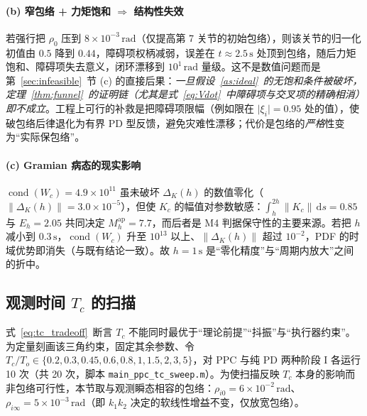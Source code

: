 \paragraph{(b) 窄包络 + 力矩饱和 \texorpdfstring{$\Rightarrow$}{=>} 结构性失效}
若强行把 \(\rho_0\) 压到 \(8\times10^{-3}\,\mathrm{rad}\)（仅提高第 7 关节的初始包络），则该关节的归一化初值由 \(0.5\) 降到 \(0.44\)，障碍项权柄减弱，误差在 \(t\approx2.5\,\mathrm{s}\) 处顶到包络，随后力矩饱和、障碍项失去意义，闭环漂移到 \(10^{1}\,\mathrm{rad}\) 量级。这不是数值问题而是第~\ref{sec:infeasible}~节 (c) 的直接后果：\emph{一旦假设~\ref{as:ideal}~的无饱和条件被破坏，定理~\ref{thm:funnel}~的证明链（尤其是式~\eqref{eq:Vdot}~中障碍项与交叉项的精确相消）即不成立}。工程上可行的补救是把障碍项限幅（例如限在 \(\lvert\xi_i\rvert=0.95\) 处的值），使破包络后律退化为有界 PD 型反馈，避免灾难性漂移；代价是包络的\emph{严格}性变为“实际保包络”。

\paragraph{(c) Gramian 病态的现实影响}
\(\operatorname{cond}(W_c)=4.9\times10^{11}\) 虽未破坏 \(\Delta_K(h)\) 的数值零化（\(\lVert\Delta_K(h)\rVert=3.0\times10^{-5}\)），但使 \(K_c\) 的幅值对参数敏感：\(\int_h^{2h}\lVert K_c\rVert\,\mathrm ds=0.85\) 与 \(E_h=2.05\) 共同决定 \(M_h^{\mathrm{ap}}=7.7\)，而后者是 M4 判据保守性的主要来源。若把 \(h\) 减小到 \(0.3\,\mathrm s\)，\(\operatorname{cond}(W_c)\) 升至 \(10^{13}\) 以上、\(\lVert\Delta_K(h)\rVert\) 超过 \(10^{-2}\)，PDF 的时域优势即消失（与既有结论一致）。故 \(h=1\,\mathrm s\) 是“零化精度”与“周期内放大”之间的折中。

\subsection{观测时间 \(T_c\) 的扫描}
\label{sec:sim_sweep}

式~\eqref{eq:tc_tradeoff}~断言 \(T_c\) 不能同时最优于“理论前提”“抖振”与“执行器约束”。为定量刻画该三角约束，固定其余参数、令 \(T_c/T_o\in\{0.2,0.3,0.45,0.6,0.8,1,1.5,2,3,5\}\)，对 PPC 与纯 PD 两种阶段 I 各运行 10 次（共 20 次，脚本 \texttt{main\_ppc\_tc\_sweep.m}）。为使扫描反映 \(T_c\) 本身的影响而非包络可行性，本节取与观测瞬态相容的包络：\(\rho_{i0}=6\times10^{-2}\,\mathrm{rad}\)、\(\rho_{i\infty}=5\times10^{-3}\,\mathrm{rad}\)（即 \(k_1k_2\) 决定的软线性增益不变，仅放宽包络）。

